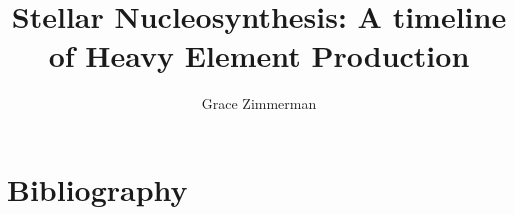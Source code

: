 \documentclass{article}
\author{Grace Zimmerman}
\title{Stellar Nucleosynthesis: A timeline of Heavy Element Production}
\begin{document}
\maketitle





\clearpage 

\section{Bibliography}



\end{document}
